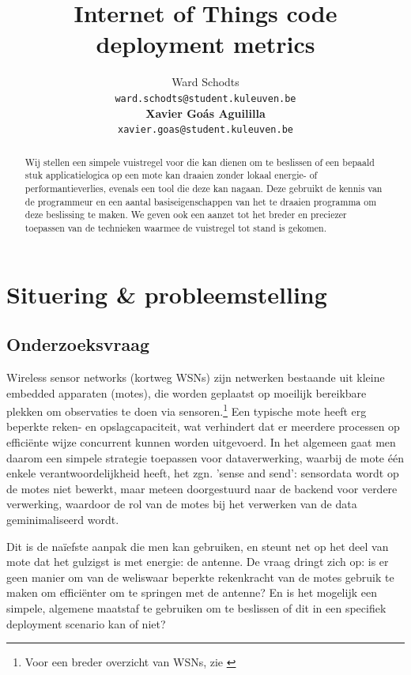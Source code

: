 \documentclass{article}
\title{Internet of Things code deployment metrics}
\author{
  Ward Schodts\\
  \texttt{ward.schodts@student.kuleuven.be}
  \\[3ex]
  \textbf{Xavier Go\'as Aguililla}\\
  \texttt{xavier.goas@student.kuleuven.be}
}
\begin{document}
\maketitle

\listoftodos
\linespread{1.3}
\begin{abstract}
Wij stellen een simpele vuistregel voor die kan dienen om te beslissen of een
bepaald stuk applicatielogica op een mote kan draaien zonder lokaal energie- of
performantieverlies, evenals een tool die deze kan nagaan. Deze gebruikt de
kennis van de programmeur en een aantal basiseigenschappen van het te draaien
programma om deze beslissing te maken. We geven ook een aanzet tot het breder en
preciezer toepassen van de technieken waarmee de vuistregel tot stand is gekomen.
  
\end{abstract}

\section{Situering \& probleemstelling}

\subsection{Onderzoeksvraag}

Wireless sensor networks (kortweg WSNs) zijn netwerken bestaande uit kleine
embedded apparaten (motes), die worden geplaatst op moeilijk bereikbare plekken
om observaties te doen via sensoren.\footnote{Voor een breder overzicht van
WSNs, zie \cite{akyildiz2002wireless}} Een typische mote heeft erg beperkte
reken- en opslagcapaciteit, wat verhindert dat er meerdere processen op
effici\"ente wijze concurrent kunnen worden uitgevoerd. In het algemeen gaat men
daarom een simpele strategie toepassen voor dataverwerking, waarbij de mote
\'e\'en enkele verantwoordelijkheid heeft, het zgn. 'sense and send': sensordata
wordt op de motes niet bewerkt, maar meteen doorgestuurd naar de backend voor
verdere verwerking, waardoor de rol van de motes bij het verwerken van de data
geminimaliseerd wordt.

Dit is de na\"iefste aanpak die men kan gebruiken, en steunt net op het deel van
mote dat het gulzigst is met energie: de antenne.  De vraag dringt zich op: is
er geen manier om van de weliswaar beperkte rekenkracht van de motes gebruik te
maken om effici\"enter om te springen met de antenne? En is het mogelijk een
simpele, algemene maatstaf te gebruiken om te beslissen of dit in een specifiek
deployment scenario kan of niet?
\end{document}
